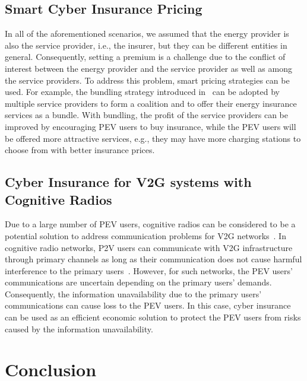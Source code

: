 \documentclass[twocolumn,10pt]{IEEEtran}
\begin{document}
\subsection{Smart Cyber Insurance Pricing}

In all of the aforementioned scenarios, we assumed that the energy provider is also the service provider, i.e., the insurer, but they can be different entities in general. Consequently, setting a premium is a challenge due to the conflict of interest between the energy provider and the service provider as well as among the service providers. To address this problem, smart pricing strategies can be used. For example, the bundling strategy introduced in~\cite{Niyato2016Smart} can be adopted by multiple service providers to form a coalition and to offer their energy insurance services as a bundle. With bundling, the profit of the service providers can be improved by encouraging PEV users to buy insurance, while the PEV users will be offered more attractive services, e.g., they may have more charging stations to choose from with better insurance prices. 


\subsection{Cyber Insurance for V2G systems with Cognitive Radios}

Due to a large number of PEV users, cognitive radios can be considered to be a potential solution to address communication problems for V2G networks~\cite{Khan2016Cognitive}. In cognitive radio networks, P2V users can communicate with V2G infrastructure through primary channels as long as their communication does not cause harmful interference to the primary users~\cite{Hoang_2014_opportunistic}. However, for such networks, the PEV users' communications are uncertain depending on the primary users' demands. Consequently, the information unavailability due to the primary users' communications can cause loss to the PEV users. In this case, cyber insurance can be used as an efficient economic solution to protect the PEV users from risks caused by the information unavailability.





\section{Conclusion}
\label{sec:conclusion}
\end{document}
